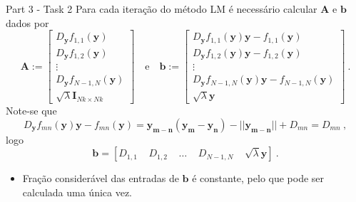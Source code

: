 \documentclass{beamer}					%
\begin{document}
\begin{frame}{Part 3 - Task 2}
	Para cada iteração do método LM é necessário calcular $\mathbf{A}$ e $\mathbf{b}$ dados por
	\begin{equation*}\label{eq:matAb}
	\mathbf{A}:= \begin{bmatrix}
	D_{\mathbf{y}} f_{1,1}(\mathbf{y})\\
	D_{\mathbf{y}} f_{1,2}(\mathbf{y})\\\vdots\\
	D_{\mathbf{y}} f_{N-1,N}(\mathbf{y})\\
	\sqrt{\lambda}\mathbf{I}_{Nk\times Nk}
	\end{bmatrix}\quad \text{e} \quad \mathbf{b}:= \begin{bmatrix}
	D_{\mathbf{y}} f_{1,1}(\mathbf{y})\mathbf{y}-f_{1,1}(\mathbf{y})\\
	D_{\mathbf{y}} f_{1,2}(\mathbf{y})\mathbf{y}-f_{1,2}(\mathbf{y})\\\vdots\\
	D_{\mathbf{y}} f_{N-1,N}(\mathbf{y})\mathbf{y}-f_{N-1,N}(\mathbf{y})\\
	\sqrt{\lambda}\mathbf{y}
	\end{bmatrix}\:.
	\end{equation*}
	Note-se que 
	\begin{equation*}\label{eq:matAbsimp}
	D_{\mathbf{y}} f_{mn}(\mathbf{y})\mathbf{y}-f_{mn}(\mathbf{y}) = \mathbf{y_{m-n}}(\mathbf{y_m}-\mathbf{y_n})-||\mathbf{y_{m-n}}||+D_{mn} = D_{mn}\:,
	\end{equation*}
	logo
	\begin{equation*}\label{eq:b}
	\mathbf{b}= \left[D_{1,1}\;\;\;\;D_{1,2}\;\;\;\;\ldots \;\;\;\;D_{N-1,N}\;\;\;\; \sqrt{\lambda}\mathbf{y} \right]\:.
	\end{equation*}
	\begin{itemize}
		\item Fração considerável das entradas de $\mathbf{b}$ é constante, pelo que pode ser calculada uma única vez.
	\end{itemize}
\end{frame}
\end{document}

